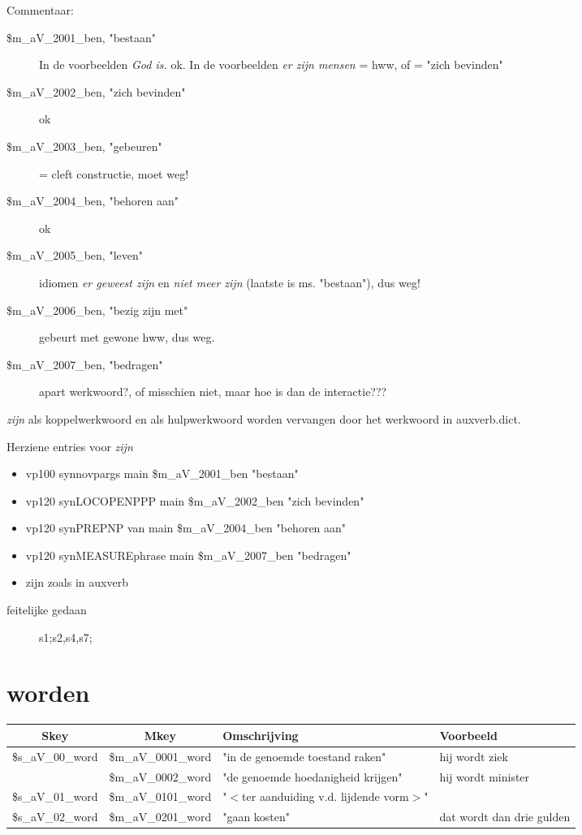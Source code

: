Commentaar:

\begin{description}
\item[\$m\_aV\_2001\_ben, "bestaan"] In de voorbeelden {\em God is.} ok. In de voorbeelden
{\em er zijn mensen} = hww, of = "zich bevinden"\\
\item[\$m\_aV\_2002\_ben, "zich bevinden"] ok
\item[\$m\_aV\_2003\_ben, "gebeuren"] = cleft constructie, moet weg!
\item[\$m\_aV\_2004\_ben, "behoren aan"] ok
\item[\$m\_aV\_2005\_ben, "leven"] idiomen {\em  er geweest zijn} en {\em  niet
meer zijn} (laatste is ms. "bestaan"), dus weg!
\item[\$m\_aV\_2006\_ben,  "bezig zijn met"] gebeurt met gewone hww, dus weg.
\item[\$m\_aV\_2007\_ben, "bedragen"] apart werkwoord?, of misschien niet, maar hoe
is dan de interactie???
\end{description}

{\em  zijn} als koppelwerkwoord en als hulpwerkwoord worden
vervangen door het werkwoord in auxverb.dict.

Herziene entries voor {\em  zijn}

\begin{itemize}
  \item vp100 synnovpargs   main \$m\_aV\_2001\_ben "bestaan"
  \item vp120 synLOCOPENPPP main \$m\_aV\_2002\_ben "zich bevinden"
  \item vp120 synPREPNP van main \$m\_aV\_2004\_ben "behoren aan"
  \item vp120 synMEASUREphrase main \$m\_aV\_2007\_ben "bedragen"
  \item zijn zoals in auxverb
\end{itemize}


\begin{description}
\item[feitelijke gedaan] s1;s2,s4,s7;\\
\end{description}

\newpage
\section{worden}

\begin{tabular}[t]{|c|c|p{}|p{}|}
\hline
Skey          & Mkey            & Omschrijving & Voorbeeld\\
\hline
\$s\_aV\_00\_word & \$m\_aV\_0001\_word &"in de genoemde toestand raken"& hij
wordt ziek\\
              & \$m\_aV\_0002\_word &"de genoemde hoedanigheid krijgen"& hij
wordt minister\\
\hline
\$s\_aV\_01\_word & \$m\_aV\_0101\_word &"$<$ter aanduiding v.d. lijdende vorm$>$" &\\
\hline
\$s\_aV\_02\_word & \$m\_aV\_0201\_word &"gaan kosten"& dat wordt dan drie
gulden\\
\hline
\end{tabular}

